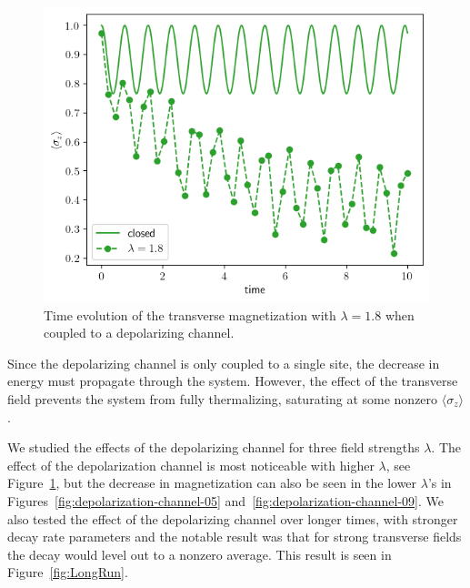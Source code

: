\documentclass[12pt, twocolumn]{article}
\begin{document}
  \begin{figure}
    \centering
    \includegraphics[width=\linewidth]{images/depolarization_channel_18.png}
    \caption{Time evolution of the transverse magnetization with \( \lambda = 1.8 \) when coupled to a depolarizing channel.%
      \label{fig:depolarization-channel-18}}
  \end{figure}

  Since the depolarizing channel is only coupled to a single site, the decrease in energy must propagate through the system. However, the effect of the transverse field prevents the system from fully thermalizing, saturating at some nonzero \( \langle \sigma_{z} \rangle \).

  We studied the effects of the depolarizing channel for three field strengths \( \lambda \). The effect of the depolarization channel is most noticeable with higher \( \lambda \), see Figure~\ref{fig:depolarization-channel-18}, but the decrease in magnetization can also be seen in the lower \( \lambda \)'s in Figures~\ref{fig:depolarization-channel-05} and~\ref{fig:depolarization-channel-09}. We also tested the effect of the depolarizing channel over longer times, with stronger decay rate parameters and the notable result was that for strong transverse fields the decay would level out to a nonzero average. This result is seen in Figure~\ref{fig:LongRun}.
\end{document}
